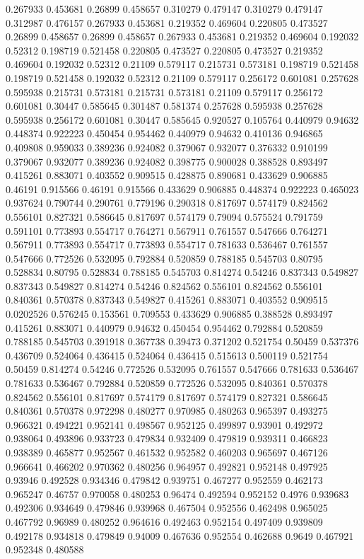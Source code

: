 0.267933 0.453681
0.26899 0.458657
0.310279 0.479147
0.310279 0.479147
0.312987 0.476157
0.267933 0.453681
0.219352 0.469604
0.220805 0.473527
0.26899 0.458657
0.26899 0.458657
0.267933 0.453681
0.219352 0.469604
0.192032 0.52312
0.198719 0.521458
0.220805 0.473527
0.220805 0.473527
0.219352 0.469604
0.192032 0.52312
0.21109 0.579117
0.215731 0.573181
0.198719 0.521458
0.198719 0.521458
0.192032 0.52312
0.21109 0.579117
0.256172 0.601081
0.257628 0.595938
0.215731 0.573181
0.215731 0.573181
0.21109 0.579117
0.256172 0.601081
0.30447 0.585645
0.301487 0.581374
0.257628 0.595938
0.257628 0.595938
0.256172 0.601081
0.30447 0.585645
0.920527 0.105764
0.440979 0.94632
0.448374 0.922223
0.450454 0.954462
0.440979 0.94632
0.410136 0.946865
0.409808 0.959033
0.389236 0.924082
0.379067 0.932077
0.376332 0.910199
0.379067 0.932077
0.389236 0.924082
0.398775 0.900028
0.388528 0.893497
0.415261 0.883071
0.403552 0.909515
0.428875 0.890681
0.433629 0.906885
0.46191 0.915566
0.46191 0.915566
0.433629 0.906885
0.448374 0.922223
0.465023 0.937624
0.790744 0.290761
0.779196 0.290318
0.817697 0.574179
0.824562 0.556101
0.827321 0.586645
0.817697 0.574179
0.79094 0.575524
0.791759 0.591101
0.773893 0.554717
0.764271 0.567911
0.761557 0.547666
0.764271 0.567911
0.773893 0.554717
0.773893 0.554717
0.781633 0.536467
0.761557 0.547666
0.772526 0.532095
0.792884 0.520859
0.788185 0.545703
0.80795 0.528834
0.80795 0.528834
0.788185 0.545703
0.814274 0.54246
0.837343 0.549827
0.837343 0.549827
0.814274 0.54246
0.824562 0.556101
0.824562 0.556101
0.840361 0.570378
0.837343 0.549827
0.415261 0.883071
0.403552 0.909515
0.0202526 0.576245
0.153561 0.709553
0.433629 0.906885
0.388528 0.893497
0.415261 0.883071
0.440979 0.94632
0.450454 0.954462
0.792884 0.520859
0.788185 0.545703
0.391918 0.367738
0.39473 0.371202
0.521754 0.50459
0.537376 0.436709
0.524064 0.436415
0.524064 0.436415
0.515613 0.500119
0.521754 0.50459
0.814274 0.54246
0.772526 0.532095
0.761557 0.547666
0.781633 0.536467
0.781633 0.536467
0.792884 0.520859
0.772526 0.532095
0.840361 0.570378
0.824562 0.556101
0.817697 0.574179
0.817697 0.574179
0.827321 0.586645
0.840361 0.570378
0.972298 0.480277
0.970985 0.480263
0.965397 0.493275
0.966321 0.494221
0.952141 0.498567
0.952125 0.499897
0.93901 0.492972
0.938064 0.493896
0.933723 0.479834
0.932409 0.479819
0.939311 0.466823
0.938389 0.465877
0.952567 0.461532
0.952582 0.460203
0.965697 0.467126
0.966641 0.466202
0.970362 0.480256
0.964957 0.492821
0.952148 0.497925
0.93946 0.492528
0.934346 0.479842
0.939751 0.467277
0.952559 0.462173
0.965247 0.46757
0.970058 0.480253
0.96474 0.492594
0.952152 0.4976
0.939683 0.492306
0.934649 0.479846
0.939968 0.467504
0.952556 0.462498
0.965025 0.467792
0.96989 0.480252
0.964616 0.492463
0.952154 0.497409
0.939809 0.492178
0.934818 0.479849
0.94009 0.467636
0.952554 0.462688
0.9649 0.467921
0.952348 0.480588
